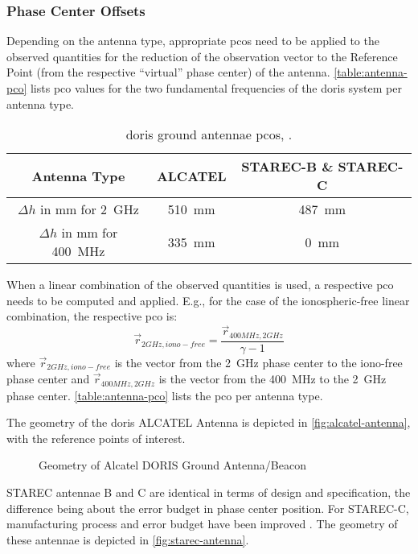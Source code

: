 \subsubsection{Phase Center Offsets}\label{sssec:doris-pco}
Depending on the antenna type, appropriate \glspl{pco} need to be applied to 
the observed quantities for the reduction of the observation vector to the 
Reference Point (from the respective ``virtual'' phase center) of the antenna. 
\autoref{table:antenna-pco} lists \gls{pco} values for the two fundamental frequencies 
of the \gls{doris} system per antenna type.

\begin{table}[h!]
    \centering
    \begin{tabular}{|c|c|c|}
        \hline
        \textbf{Antenna Type} & \textbf{ALCATEL} & \textbf{STAREC-B} \& \textbf{STAREC-C} \\
        \hline
        $\Delta h$ in \si{\mm} for \SI{2}{\GHz} & \SI{510}{\mm} & \SI{487}{\mm}\\
        $\Delta h$ in \si{\mm} for \SI{400}{\MHz} & \SI{335}{\mm} & \SI{0}{\mm}\\
        \hline
    \end{tabular}
    \caption{\gls{doris} ground antennae \glspl{pco}, \cite{DORISGSM}.}
    \label{table:antenna-pco}
\end{table}

When a linear combination of the observed quantities is used, a respective 
\gls{pco} needs to be computed and applied. E.g., for the case of the 
ionospheric-free linear combination, the respective \gls{pco} is:
\begin{equation}
    \vec{r}_{2GHz,iono-free} = \frac{\vec{r}_{400MHz,2GHz}}{\gamma - 1}
\end{equation}
where $\vec{r}_{2GHz,iono-free}$ is the vector from the \SI{2}{\GHz} phase
center to the iono-free phase center and $\vec{r}_{400MHz,2GHz}$ is
the vector from the \SI{400}{MHz} to the \SI{2}{\GHz} phase center. \autoref{table:antenna-pco} 
lists the \gls{pco} per antenna type.

The geometry of the \gls{doris} ALCATEL Antenna is depicted in \autoref{fig:alcatel-antenna}, 
with the reference points of interest.
\begin{figure}
  \centering
  
  \caption{Geometry of Alcatel DORIS Ground Antenna/Beacon}
  \label{fig:alcatel-antenna}
\end{figure}

STAREC antennae B and C are identical in terms of design and specification, the
difference being about the error budget in phase center position. For STAREC-C,
manufacturing process and error budget have been improved \cite{DORISGSM}. The geometry 
of these antennae is depicted in \autoref{fig:starec-antenna}.

